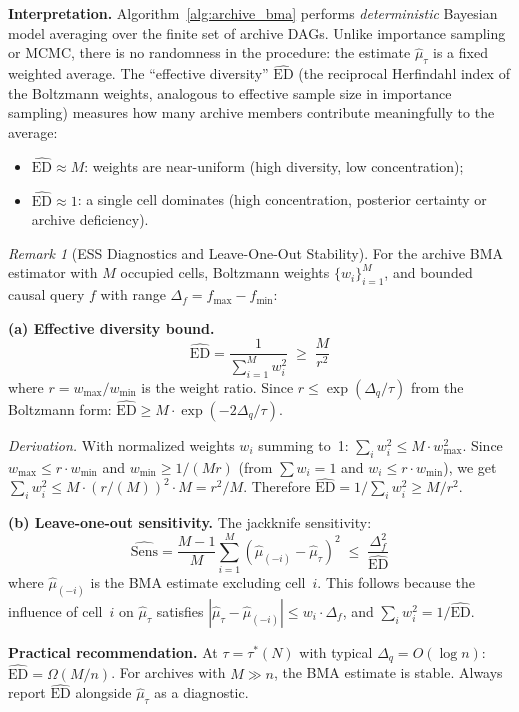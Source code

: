 \documentclass{article}
\theoremstyle{definition}
\theoremstyle{plain}
\theoremstyle{remark}
\newtheorem{remark}{Remark}
\begin{document}
\textbf{Interpretation.} Algorithm~\ref{alg:archive_bma} performs
\emph{deterministic} Bayesian model averaging over the finite set of
archive DAGs. Unlike importance sampling or MCMC, there is no randomness
in the procedure: the estimate $\hat{\mu}_\tau$ is a fixed weighted
average. The ``effective diversity'' $\widehat{\mathrm{ED}}$ (the
reciprocal Herfindahl index of the Boltzmann weights, analogous to
effective sample size in importance sampling) measures how many archive
members contribute meaningfully to the average:
\begin{itemize}
  \item $\widehat{\mathrm{ED}} \approx M$: weights are near-uniform (high
    diversity, low concentration);
  \item $\widehat{\mathrm{ED}} \approx 1$: a single cell dominates (high
    concentration, posterior certainty or archive deficiency).
\end{itemize}

\begin{remark}[ESS Diagnostics and Leave-One-Out Stability]
\label{rem:loo_stability}
For the archive BMA estimator with $M$ occupied cells, Boltzmann weights
$\{w_i\}_{i=1}^M$, and bounded causal query $f$ with range
$\Delta_f = f_{\max} - f_{\min}$:

\textbf{(a) Effective diversity bound.}
\begin{equation}
  \widehat{\mathrm{ED}} = \frac{1}{\sum_{i=1}^M w_i^2}
  \;\geq\; \frac{M}{r^2}
\end{equation}
where $r = w_{\max}/w_{\min}$ is the weight ratio. Since
$r \leq \exp(\Delta_q/\tau)$ from the Boltzmann form:
$\widehat{\mathrm{ED}} \geq M \cdot \exp(-2\Delta_q/\tau)$.

\emph{Derivation.} With normalized weights $w_i$ summing to~1:
$\sum_i w_i^2 \leq M \cdot w_{\max}^2$. Since $w_{\max} \leq
r \cdot w_{\min}$ and $w_{\min} \geq 1/(Mr)$ (from $\sum w_i = 1$
and $w_i \leq r \cdot w_{\min}$), we get
$\sum_i w_i^2 \leq M \cdot (r/(M))^2 \cdot M = r^2/M$. Therefore
$\widehat{\mathrm{ED}} = 1/\sum_i w_i^2 \geq M/r^2$.

\textbf{(b) Leave-one-out sensitivity.} The jackknife sensitivity:
\begin{equation}
  \widehat{\mathrm{Sens}} = \frac{M-1}{M}\sum_{i=1}^M
    (\hat{\mu}_{(-i)} - \hat{\mu}_\tau)^2
  \;\leq\; \frac{\Delta_f^2}{\widehat{\mathrm{ED}}}
\end{equation}
where $\hat{\mu}_{(-i)}$ is the BMA estimate excluding cell~$i$. This
follows because the influence of cell~$i$ on $\hat{\mu}_\tau$ satisfies
$|\hat{\mu}_\tau - \hat{\mu}_{(-i)}| \leq w_i \cdot \Delta_f$, and
$\sum_i w_i^2 = 1/\widehat{\mathrm{ED}}$.

\textbf{Practical recommendation.} At $\tau = \tau^*(N)$ with typical
$\Delta_q = O(\log n)$: $\widehat{\mathrm{ED}} = \Omega(M/n)$. For
archives with $M \gg n$, the BMA estimate is stable. Always report
$\widehat{\mathrm{ED}}$ alongside $\hat{\mu}_\tau$ as a diagnostic.
\end{remark}
\end{document}
